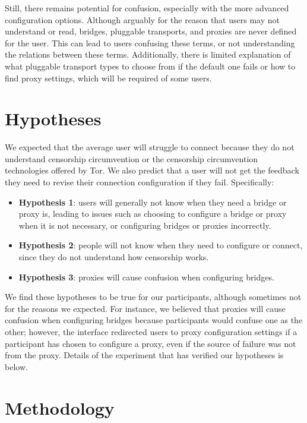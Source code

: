 \documentclass{template}
\begin{document}
Still, there remains potential for confusion, especially with the more advanced
configuration options. Although arguably for the reason that users may not 
understand or read, bridges, pluggable transports, and  proxies are never defined 
for the user. This can lead to users confusing these terms, or not understanding
the relations between these terms. Additionally, there is limited explanation of 
what pluggable transport types to choose from if the default one fails or how to 
find proxy settings, which will be required of some users. 

\section{Hypotheses}
We expected that the average user will struggle to connect because they do not understand censorship circumvention or the  censorship circumvention technologies offered by Tor. We also predict that a user will not get the feedback they need to revise their connection configuration if they fail. Specifically: 

\begin{itemize} \itemsep1pt \parskip0pt 
\item  {\bfseries Hypothesis 1}: users will generally not know when they need a bridge or proxy is, leading to issues such as choosing to configure a bridge or proxy when it is not necessary, or configuring bridges or proxies incorrectly. 
\item  {\bfseries Hypothesis 2}: people will not know when they need to configure or connect, since they do not understand how censorship works.   
\item  {\bfseries Hypothesis 3}: proxies will cause confusion when configuring bridges. 
\end{itemize} 

We find these hypotheses to be true for our participants, although sometimes not for the reasons we expected. For instance, we believed that proxies will cause confusion when configuring bridges because participants would confuse one as the other; however, the interface redirected users to proxy configuration settings if a participant has chosen to configure a proxy, even if the source of failure was not from the proxy. Details of the experiment that has verified our hypotheses is below.  

\section{Methodology}
\end{document}
